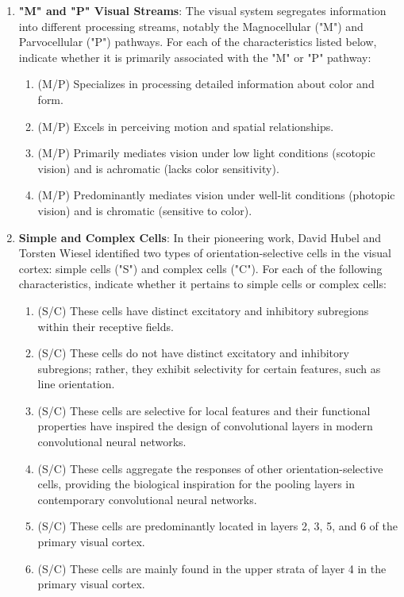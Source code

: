 \documentclass[11pt,letterpaper]{article}
\begin{document}
\begin{enumerate}
   \item \textbf{"M" and "P" Visual Streams}: The visual system segregates information into different processing streams, notably the Magnocellular ("M") and Parvocellular ("P") pathways. For each of the characteristics listed below, indicate whether it is primarily associated with the "M" or "P" pathway:
    \begin{enumerate}
        \item (M/P) Specializes in processing detailed information about color and form.
        \item (M/P) Excels in perceiving motion and spatial relationships.
        \item (M/P) Primarily mediates vision under low light conditions (scotopic vision) and is achromatic (lacks color sensitivity).
        \item (M/P) Predominantly mediates vision under well-lit conditions (photopic vision) and is chromatic (sensitive to color).
    \end{enumerate}

    \item \textbf{Simple and Complex Cells}: In their pioneering work, David Hubel and Torsten Wiesel identified two types of orientation-selective cells in the visual cortex: simple cells ("S") and complex cells ("C"). For each of the following characteristics, indicate whether it pertains to simple cells or complex cells:
    \begin{enumerate}
    \item (S/C) These cells have distinct excitatory and inhibitory subregions within their receptive fields.
    \item (S/C) These cells do not have distinct excitatory and inhibitory subregions; rather, they exhibit selectivity for certain features, such as line orientation.
    \item (S/C) These cells are selective for local features and their functional properties have inspired the design of convolutional layers in modern convolutional neural networks.
    \item (S/C) These cells aggregate the responses of other orientation-selective cells, providing the biological inspiration for the pooling layers in contemporary convolutional neural networks.
    \item (S/C) These cells are predominantly located in layers 2, 3, 5, and 6 of the primary visual cortex.
    \item (S/C) These cells are mainly found in the upper strata of layer 4 in the primary visual cortex.
    \end{enumerate}


\end{enumerate}
\end{document}
